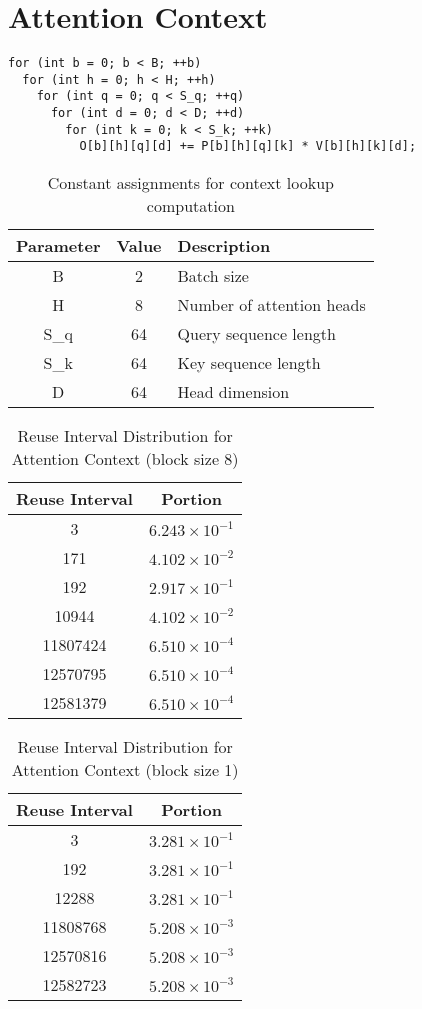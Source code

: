 \documentclass[conference]{article}
\begin{document}
\section{Attention Context}
\begin{verbatim}
for (int b = 0; b < B; ++b)
  for (int h = 0; h < H; ++h)
    for (int q = 0; q < S_q; ++q)
      for (int d = 0; d < D; ++d)
        for (int k = 0; k < S_k; ++k)
          O[b][h][q][d] += P[b][h][q][k] * V[b][h][k][d];
\end{verbatim}

\begin{table}[H]
\centering
\begin{tabular}{|c|c|l|}
    \hline
    Parameter & Value & Description \\
    \hline
    B & 2 & Batch size \\
    H & 8 & Number of attention heads \\
    S\_q & 64 & Query sequence length \\
    S\_k & 64 & Key sequence length \\
    D & 64 & Head dimension \\
    \hline
  \end{tabular}
  \caption{Constant assignments for context lookup computation}
\end{table}

\begin{table}[H]
\centering
\begin{tabular}{|c|c|}
    \hline
    Reuse Interval & Portion \\ 
    \hline
    3 & $6.243 \times 10^{-1}$ \\ 
    171 & $4.102 \times 10^{-2}$ \\ 
    192 & $2.917 \times 10^{-1}$ \\ 
    10944 & $4.102 \times 10^{-2}$ \\ 
    11807424 & $6.510 \times 10^{-4}$ \\ 
    12570795 & $6.510 \times 10^{-4}$ \\ 
    12581379 & $6.510 \times 10^{-4}$ \\ 
    \hline
\end{tabular}
\caption{Reuse Interval Distribution for Attention Context (block size 8)}
\end{table}

\begin{table}[H]
\centering
\begin{tabular}{|c|c|}
    \hline
    Reuse Interval & Portion \\ 
    \hline
    3 & $3.281 \times 10^{-1}$ \\ 
    192 & $3.281 \times 10^{-1}$ \\ 
    12288 & $3.281 \times 10^{-1}$ \\ 
    11808768 & $5.208 \times 10^{-3}$ \\ 
    12570816 & $5.208 \times 10^{-3}$ \\ 
    12582723 & $5.208 \times 10^{-3}$ \\ 
    \hline
\end{tabular}
\caption{Reuse Interval Distribution for Attention Context (block size 1)}
\end{table}
\end{document}
